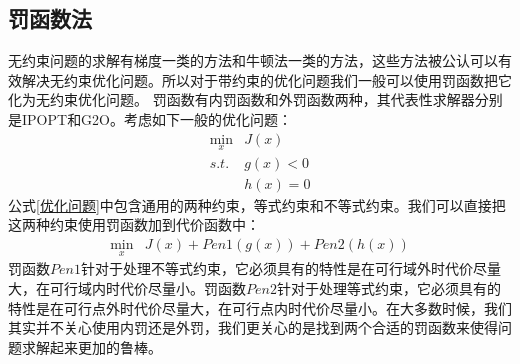 \documentclass[master,academic]{ysuthesis} %
\begin{document}
		\subsection{罚函数法}
		无约束问题的求解有梯度一类的方法和牛顿法一类的方法，这些方法被公认可以有效解决无约束优化问题。所以对于带约束的优化问题我们一般可以使用罚函数把它化为无约束优化问题。
		罚函数有内罚函数和外罚函数两种，其代表性求解器分别是IPOPT\cite{curtis2010interior}和G2O\cite{kummerle2011g}。考虑如下一般的优化问题：
		\begin{equation}
			\begin{aligned}
				\min_{x} &J(x)\\
					s.t. &g(x)<0\\
					&h(x)=0
			\end{aligned}
			\label{优化问题}
		\end{equation}
		公式\ref{优化问题}中包含通用的两种约束，等式约束和不等式约束。我们可以直接把这两种约束使用罚函数加到代价函数中：
		\begin{equation}
			\begin{aligned}
				\min_{x} &J(x)+Pen1(g(x))+Pen2(h(x))
			\end{aligned}
		\end{equation}
		罚函数$Pen1$针对于处理不等式约束，它必须具有的特性是在可行域外时代价尽量大，在可行域内时代价尽量小。罚函数$Pen2$针对于处理等式约束，它必须具有的特性是在可行点外时代价尽量大，在可行点内时代价尽量小。在大多数时候，我们其实并不关心使用内罚还是外罚，我们更关心的是找到两个合适的罚函数来使得问题求解起来更加的鲁棒。
\end{document}
